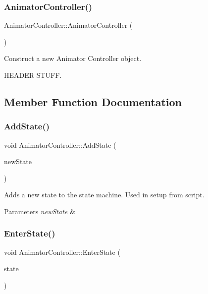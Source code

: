 \subsubsection{\texorpdfstring{Animator\+Controller()}{AnimatorController()}}
{\footnotesize\ttfamily Animator\+Controller\+::\+Animator\+Controller (\begin{DoxyParamCaption}{ }\end{DoxyParamCaption})}



Construct a new Animator Controller object. 

H\+E\+A\+D\+ER S\+T\+U\+FF. 

\subsection{Member Function Documentation}
\mbox{\label{classAnimatorController_a7e2acba88b4bc663c3bc3a04c20962c8}} 
\subsubsection{\texorpdfstring{Add\+State()}{AddState()}}
{\footnotesize\ttfamily void Animator\+Controller\+::\+Add\+State (\begin{DoxyParamCaption}\item[{\hyperlink{structAnimState}{Anim\+State} $\ast$}]{new\+State }\end{DoxyParamCaption})}



Adds a new state to the state machine. Used in setup from script. 


\begin{DoxyParams}{Parameters}
{\em new\+State} & \\
\hline
\end{DoxyParams}
\mbox{\label{classAnimatorController_a4717fb9e8e96c4cd7fff48ed38db6ae8}} 
\subsubsection{\texorpdfstring{Enter\+State()}{EnterState()}}
{\footnotesize\ttfamily void Animator\+Controller\+::\+Enter\+State (\begin{DoxyParamCaption}\item[{\hyperlink{structAnimState}{Anim\+State} $\ast$}]{state }\end{DoxyParamCaption})}



